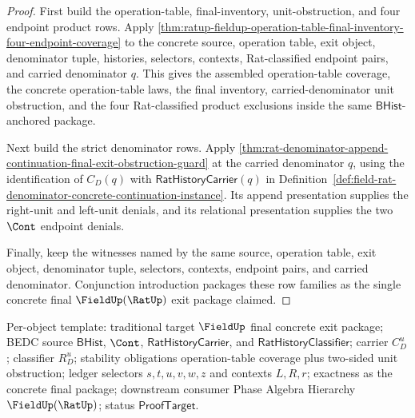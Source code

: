 \begin{proof}
First build the operation-table, final-inventory, unit-obstruction, and four
endpoint product rows. Apply
\autoref{thm:ratup-fieldup-operation-table-final-inventory-four-endpoint-coverage} to
the concrete source, operation table, exit object, denominator tuple, histories,
selectors, contexts, Rat-classified endpoint pairs, and carried denominator
$q$. This gives the assembled operation-table coverage, the concrete
operation-table laws, the final inventory, carried-denominator unit
obstruction, and the four Rat-classified product exclusions inside the same
$\mathsf{BHist}$-anchored package.

Next build the strict denominator rows. Apply
\autoref{thm:rat-denominator-append-continuation-final-exit-obstruction-guard}
at the carried denominator $q$, using the identification of $C_D(q)$ with
$\mathsf{RatHistoryCarrier}(q)$ in
Definition~\ref{def:field-rat-denominator-concrete-continuation-instance}. Its
append presentation supplies the right-unit and left-unit denials, and its
relational presentation supplies the two $\Cont$ endpoint denials.

Finally, keep the witnesses named by the same source, operation table, exit
object, denominator tuple, selectors, contexts, endpoint pairs, and carried
denominator. Conjunction introduction packages these row families as the single
concrete final $\FieldUp(\RatUp)$ exit package claimed.
\end{proof}

Per-object template: traditional target $\FieldUp$ final concrete exit package;
BEDC source $\mathsf{BHist}$, $\Cont$, $\mathsf{RatHistoryCarrier}$, and
$\mathsf{RatHistoryClassifier}$; carrier $C_D^u$; classifier $R_D^u$; stability
obligations operation-table coverage plus two-sided unit obstruction; ledger
selectors $s,t,u,v,w,z$ and contexts $L,R,r$; exactness as the concrete final
package; downstream consumer Phase Algebra Hierarchy $\FieldUp(\RatUp)$; status
$\mathsf{ProofTarget}$.

